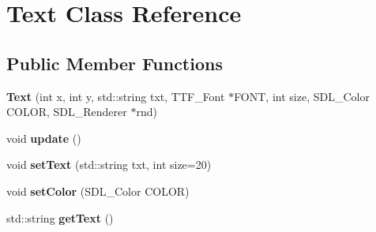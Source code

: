 \hypertarget{classText}{}\section{Text Class Reference}
\label{classText}
\subsection*{Public Member Functions}
\begin{DoxyCompactItemize}
\item 
\hypertarget{classText_a072f1a0f77bf9a4f98e0019164c91e8a}{}{\bfseries Text} (int x, int y, std\+::string txt, T\+T\+F\+\_\+\+Font $\ast$F\+O\+N\+T, int size, S\+D\+L\+\_\+\+Color C\+O\+L\+O\+R, S\+D\+L\+\_\+\+Renderer $\ast$rnd)\label{classText_a072f1a0f77bf9a4f98e0019164c91e8a}

\item 
\hypertarget{classText_a7d35d487d1b61052257473d88392d6fb}{}void {\bfseries update} ()\label{classText_a7d35d487d1b61052257473d88392d6fb}

\item 
\hypertarget{classText_ae0ebbbf31a5913c9ff35ab56155308f6}{}void {\bfseries set\+Text} (std\+::string txt, int size=20)\label{classText_ae0ebbbf31a5913c9ff35ab56155308f6}

\item 
\hypertarget{classText_acaf0220cf5f9c5346570ccad63628e82}{}void {\bfseries set\+Color} (S\+D\+L\+\_\+\+Color C\+O\+L\+O\+R)\label{classText_acaf0220cf5f9c5346570ccad63628e82}

\item 
\hypertarget{classText_a41bde5662e0e3a023166e5b134488bc2}{}std\+::string {\bfseries get\+Text} ()\label{classText_a41bde5662e0e3a023166e5b134488bc2}

\end{DoxyCompactItemize}
